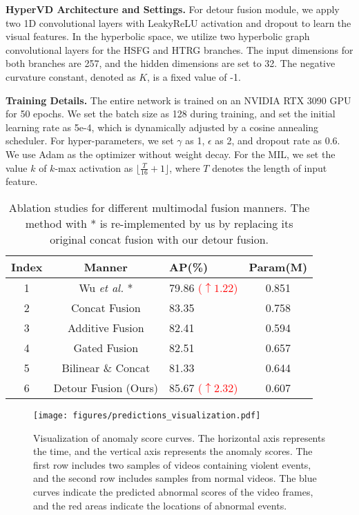 \documentclass[sigconf]{acmart}
\newcommand{\etal}{{\emph{et al. }}}
\begin{document}
\noindent\textbf{HyperVD Architecture and Settings.} For detour fusion module, we apply two 1D convolutional layers with LeakyReLU activation and dropout to learn the visual features. In the hyperbolic space, we utilize two hyperbolic graph convolutional layers for the HSFG and HTRG branches. The input dimensions for both branches are 257, and the hidden dimensions are set to 32. The negative curvature constant, denoted as $K$, is a fixed value of -1.

\noindent\textbf{Training Details.} The entire network is trained on an NVIDIA RTX 3090 GPU for 50 epochs. We set the batch size as 128 during training, and set the initial learning rate as 5e-4, which is dynamically adjusted by a cosine annealing scheduler. For hyper-parameters, we set $\gamma$ as 1, $\epsilon$ as 2, and dropout rate as 0.6. We use Adam as the optimizer without weight decay. For the MIL, we set the value $k$ of $k$-max activation as $\lfloor \frac{T}{16} + 1\rfloor$, where $T$ denotes the length of input feature.

\begin{table}[t]
  \caption{Ablation studies for different multimodal fusion manners. The method with * is re-implemented by us by replacing its original concat fusion with our detour fusion.}
  \label{table2}
  \begin{tabular}{cclc}
    \toprule
    Index    & Manner  & AP(\%) & Param(M)\\
    \midrule 
     1 &     Wu \etal* \cite{c:2}  & 79.86 \textcolor{red}{($\uparrow1.22$)} & 0.851  \\\midrule 
     2 &      Concat Fusion &	83.35	& 0.758\\
     3 &     Additive Fusion &	82.41	& 0.594 \\
     4 &      Gated Fusion	&   82.51	& 0.657  \\
     5 &     Bilinear \& Concat	& 81.33	& 0.644\\
     6 &     Detour Fusion (Ours)& 85.67 \textcolor{red}{($\uparrow2.32$)}	& 0.607 \\ 
    \bottomrule
\end{tabular}
\end{table}

\begin{figure*}[t]
	\centering
	\texttt{[image: figures/predictions\_visualization.pdf]} \caption{Visualization of anomaly score curves. The horizontal axis represents the time, and the vertical axis represents the anomaly scores. The first row includes two samples of videos containing violent events, and the second row includes samples from normal videos. The blue curves indicate the predicted abnormal scores of the video frames, and the red areas indicate the locations of abnormal events.}
	\label{fig3}
\end{figure*}
\end{document}
